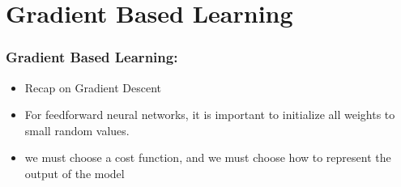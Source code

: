 \documentclass{beamer}
\begin{document}
\section{Gradient Based Learning}
\begin{frame}
	\frametitle{Gradient Based Learning:}
\begin{itemize}
	\item Recap on Gradient Descent
		\pause
	\item For feedforward neural networks, it is important to
initialize all weights to small random values. 
\item we must choose a cost function, and we must choose how to represent the output of the model
	
\end{itemize}
\end{frame}
\end{document}
